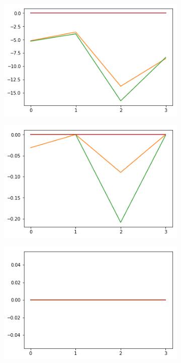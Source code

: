 \begin{figure}[h!]
  \begin{subfigure}[b]{0.3\linewidth}
    \includegraphics[width=\linewidth]{images/compl/ef0_means_neg.png}
    \caption{}
  \end{subfigure}
  \begin{subfigure}[b]{0.3\linewidth}
    \includegraphics[width=\linewidth]{images/compl/ef1_means_neg.png}
    \caption{}
  \end{subfigure}
  \begin{subfigure}[b]{0.3\linewidth}
    \includegraphics[width=\linewidth]{images/compl/ef2_means_neg.png}
    \caption{}
  \end{subfigure}
    

\end{figure}
